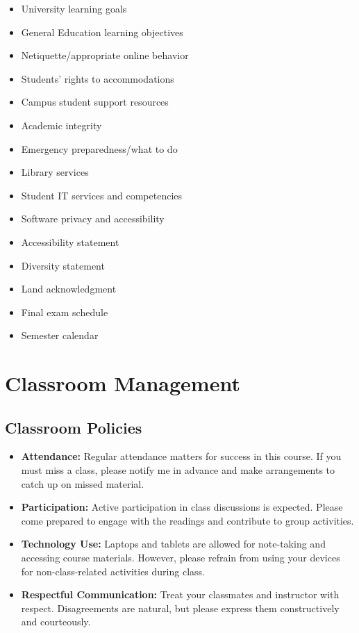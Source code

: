 \documentclass[11pt]{article}     %
\begin{document}
\begin{itemize}
\item University learning goals
\item General Education learning objectives
\item Netiquette/appropriate online behavior
\item Students' rights to accommodations
\item Campus student support resources
\item Academic integrity
\item Emergency preparedness/what to do
\item Library services
\item Student IT services and competencies
\item Software privacy and accessibility
\item Accessibility statement
\item Diversity statement
\item Land acknowledgment
\item Final exam schedule
\item Semester calendar
\end{itemize}

\section*{Classroom Management}
\subsection*{Classroom Policies}
\begin{itemize}
    \item \textbf{Attendance:} Regular attendance matters for success in this course. If you must miss a class, please notify me in advance and make arrangements to catch up on missed material.
    \item \textbf{Participation:} Active participation in class discussions is expected. Please come prepared to engage with the readings and contribute to group activities.
    \item \textbf{Technology Use:} Laptops and tablets are allowed for note-taking and accessing course materials. However, please refrain from using your devices for non-class-related activities during class.
    \item \textbf{Respectful Communication:} Treat your classmates and instructor with respect. Disagreements are natural, but please express them constructively and courteously.
\end{itemize}
\end{document}
